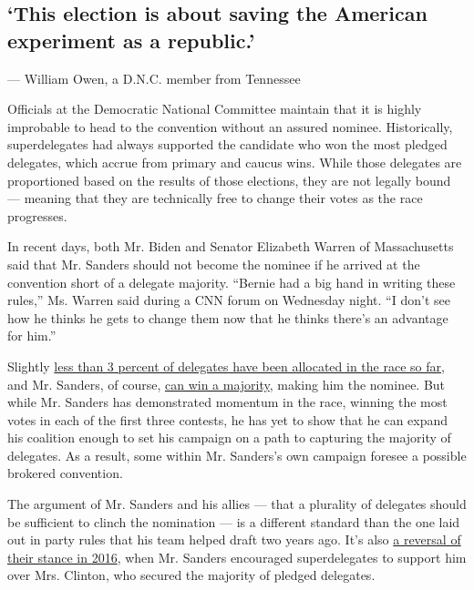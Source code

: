\hypertarget{this-election-is-about-saving-the-american-experiment-as-a-republic}{%
\subsection{`This election is about saving the American experiment as a
republic.'}\label{this-election-is-about-saving-the-american-experiment-as-a-republic}}

--- William Owen, a D.N.C. member from Tennessee

Officials at the Democratic National Committee maintain that it is
highly improbable to head to the convention without an assured nominee.
Historically, superdelegates had always supported the candidate who won
the most pledged delegates, which accrue from primary and caucus wins.
While those delegates are proportioned based on the results of those
elections, they are not legally bound --- meaning that they are
technically free to change their votes as the race progresses.

In recent days, both Mr. Biden and Senator Elizabeth Warren of
Massachusetts said that Mr. Sanders should not become the nominee if he
arrived at the convention short of a delegate majority. ``Bernie had a
big hand in writing these rules,'' Ms. Warren said during a CNN forum on
Wednesday night. ``I don't see how he thinks he gets to change them now
that he thinks there's an advantage for him.''

Slightly
\href{https://www.nytimes3xbfgragh.onion/interactive/2020/us/elections/delegate-count-primary-results.html}{less
than 3 percent of delegates have been allocated in the race so far}, and
Mr. Sanders, of course,
\href{https://www.nytimes3xbfgragh.onion/2020/02/12/upshot/bernie-sanders-2020-path.html}{can
win a majority}, making him the nominee. But while Mr. Sanders has
demonstrated momentum in the race, winning the most votes in each of the
first three contests, he has yet to show that he can expand his
coalition enough to set his campaign on a path to capturing the majority
of delegates. As a result, some within Mr. Sanders's own campaign
foresee a possible brokered convention.

The argument of Mr. Sanders and his allies --- that a plurality of
delegates should be sufficient to clinch the nomination --- is a
different standard than the one laid out in party rules that his team
helped draft two years ago. It's also
\href{https://www.nytimes3xbfgragh.onion/politics/first-draft/2016/05/01/bernie-sanders-says-superdelegates-should-follow-voters-will-in-landslide-states/}{a
reversal of their stance in 2016}, when Mr. Sanders encouraged
superdelegates to support him over Mrs. Clinton, who secured the
majority of pledged delegates.

